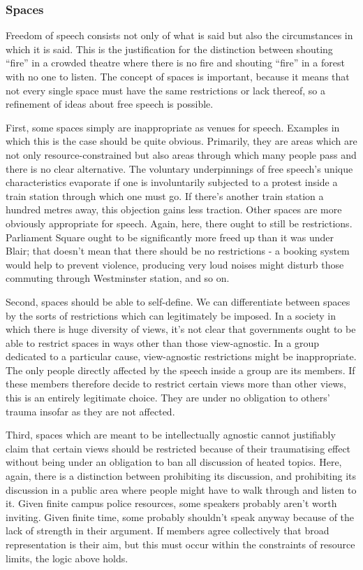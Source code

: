 \subsubsection{Spaces}\label{spaces}

Freedom of speech consists not only of what is said but also the
circumstances in which it is said. This is the justification for the
distinction between shouting ``fire'' in a crowded theatre where there
is no fire and shouting ``fire'' in a forest with no one to listen. The
concept of spaces is important, because it means that not every single
space must have the same restrictions or lack thereof, so a refinement
of ideas about free speech is possible.

First, some spaces simply are inappropriate as venues for speech.
Examples in which this is the case should be quite obvious. Primarily,
they are areas which are not only resource-constrained but also areas
through which many people pass and there is no clear alternative. The
voluntary underpinnings of free speech's unique characteristics
evaporate if one is involuntarily subjected to a protest inside a train
station through which one must go. If there's another train station a
hundred metres away, this objection gains less traction. Other spaces
are more obviously appropriate for speech. Again, here, there ought to
still be restrictions. Parliament Square ought to be significantly more
freed up than it was under Blair; that doesn't mean that there should be
no restrictions - a booking system would help to prevent violence,
producing very loud noises might disturb those commuting through
Westminster station, and so on.

Second, spaces should be able to self-define. We can differentiate
between spaces by the sorts of restrictions which can legitimately be
imposed. In a society in which there is huge diversity of views, it's
not clear that governments ought to be able to restrict spaces in ways
other than those view-agnostic. In a group dedicated to a particular
cause, view-agnostic restrictions might be inappropriate. The only
people directly affected by the speech inside a group are its members.
If these members therefore decide to restrict certain views more than
other views, this is an entirely legitimate choice. They are under no
obligation to others' trauma insofar as they are not affected.

Third, spaces which are meant to be intellectually agnostic cannot
justifiably claim that certain views should be restricted because of
their traumatising effect without being under an obligation to ban all
discussion of heated topics. Here, again, there is a distinction between
prohibiting its discussion, and prohibiting its discussion in a public
area where people might have to walk through and listen to it. Given
finite campus police resources, some speakers probably aren't worth
inviting. Given finite time, some probably shouldn't speak anyway
because of the lack of strength in their argument. If members agree
collectively that broad representation is their aim, but this must occur
within the constraints of resource limits, the logic above holds.

